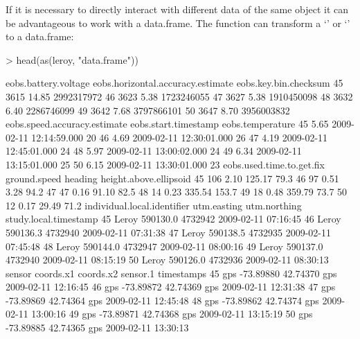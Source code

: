 \documentclass[article,nojss]{jss}
\newcommand{\fct}[1]{{\code{#1()}}}
\newcommand{\class}[1]{{`\code{#1}'}}
\begin{document}
If it is necessary to directly interact with different data of the same object it can be advantageous to work with a data.frame. The \fct{as} function can transform a \class{Move} or \class{MoveStack} to a data.frame:

\begin{Schunk}
\begin{Sinput}
> head(as(leroy, "data.frame"))
\end{Sinput}
\begin{Soutput}
   eobs.battery.voltage eobs.horizontal.accuracy.estimate eobs.key.bin.checksum
45                 3615                             14.85            2992317972
46                 3623                              5.38            1723246055
47                 3627                              5.38            1910450098
48                 3632                              6.40            2286746099
49                 3642                              7.68            3797866101
50                 3647                              8.70            3956003832
   eobs.speed.accuracy.estimate    eobs.start.timestamp eobs.temperature
45                         5.65 2009-02-11 12:14:59.000               20
46                         4.69 2009-02-11 12:30:01.000               26
47                         4.19 2009-02-11 12:45:01.000               24
48                         5.97 2009-02-11 13:00:02.000               24
49                         6.34 2009-02-11 13:15:01.000               25
50                         6.15 2009-02-11 13:30:01.000               23
   eobs.used.time.to.get.fix ground.speed heading height.above.ellipsoid
45                       106         2.10  125.17                   79.3
46                        97         0.51    3.28                   94.2
47                        47         0.16   91.10                   82.5
48                        14         0.23  335.54                  153.7
49                        18         0.48  359.79                   73.7
50                        12         0.17   29.49                   71.2
   individual.local.identifier utm.easting utm.northing study.local.timestamp
45                       Leroy    590130.0      4732942   2009-02-11 07:16:45
46                       Leroy    590136.3      4732940   2009-02-11 07:31:38
47                       Leroy    590138.5      4732935   2009-02-11 07:45:48
48                       Leroy    590144.0      4732947   2009-02-11 08:00:16
49                       Leroy    590137.0      4732940   2009-02-11 08:15:19
50                       Leroy    590126.0      4732936   2009-02-11 08:30:13
   sensor coords.x1 coords.x2 sensor.1          timestamps
45    gps -73.89880  42.74370      gps 2009-02-11 12:16:45
46    gps -73.89872  42.74369      gps 2009-02-11 12:31:38
47    gps -73.89869  42.74364      gps 2009-02-11 12:45:48
48    gps -73.89862  42.74374      gps 2009-02-11 13:00:16
49    gps -73.89871  42.74368      gps 2009-02-11 13:15:19
50    gps -73.89885  42.74365      gps 2009-02-11 13:30:13
\end{Soutput}
\end{Schunk}
\end{document}
